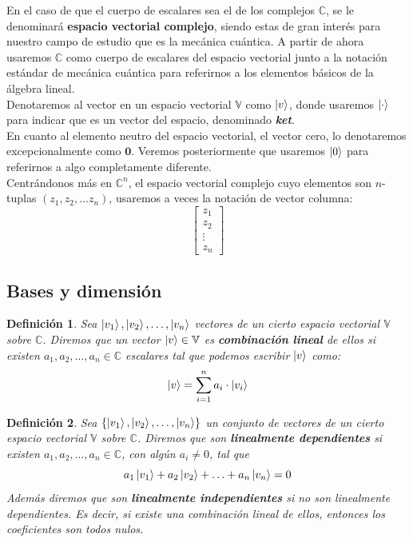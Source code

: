 \documentclass[a4paper]{article}
\newtheorem{deff}{Definición}[section]
\numberwithin{equation}{section}
\begin{document}
En el caso de que el cuerpo de escalares sea el de los complejos $\mathbb{C}$, se le denominará \textbf{espacio vectorial complejo}, siendo estas de gran interés para nuestro campo de estudio que es la mecánica cuántica.
A partir de ahora usaremos $\mathbb{C}$ como cuerpo de escalares del espacio vectorial junto a la notación estándar de mecánica cuántica para referirnos a los elementos básicos de la álgebra lineal.\\
\linebreak
Denotaremos al vector en un espacio vectorial $\mathbb{V}$ como $\ket{v}$, donde usaremos $\ket{\cdot}$ para indicar que es un vector del espacio, denominado \textbf{\textit{ket}}.\\
En cuanto al elemento neutro del espacio vectorial, el vector cero, lo denotaremos excepcionalmente como $\mathbf{0}$. Veremos posteriormente que usaremos $\ket{0}$ para referirnos a algo completamente diferente.\\
Centrándonos más en $\mathbb{C}^n$, el espacio vectorial complejo cuyo elementos son $n$-tuplas $(z_1, z_2, \ldots z_n)$, usaremos a veces la notación de vector columna:
$$\begin{bmatrix}
z_1 \\ z_2 \\ \vdots \\ z_n
\end{bmatrix}$$

\subsection{Bases y dimensión}

\begin{deff} Sea $\ket{v_1},\ket{v_2}, \ldots, \ket{v_n}$ vectores de un cierto espacio vectorial $\mathbb{V}$ sobre $\mathbb{C}$. Diremos que un vector $\ket{v}\in\mathbb{V}$ es \textbf{combinación lineal} de ellos si existen $a_1, a_2, \ldots, a_n \in \mathbb{C}$ escalares tal que podemos escribir $\ket{v}$ como:
\begin{equation}
\ket{v} = \sum_{i=1}^n a_i \cdot \ket{v_i}
\end{equation}
\end{deff}

\begin{deff} Sea $\{ \ket{v_1},\ket{v_2}, \ldots, \ket{v_n} \}$ un conjunto de vectores de un cierto espacio vectorial $\mathbb{V}$ sobre $\mathbb{C}$. Diremos que son \textbf{linealmente dependientes} si existen $a_1, a_2, \ldots, a_n \in \mathbb{C}$, con algún $a_i \neq 0$, tal que
\begin{equation}
a_1\ket{v_1} + a_2\ket{v_2} + \ldots + a_n\ket{v_n} = 0
\end{equation}
Además diremos que son \textbf{linealmente independientes} si no son linealmente dependientes. Es decir, si existe una combinación lineal de ellos, entonces los coeficientes son todos nulos.
\end{deff}
\end{document}
